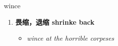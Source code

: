 
\begin{frame}
{\huge wince}
\begin{center}
\begin{enumerate}\Large
  \item \textbf{畏缩，退缩 shrinke back}
  \begin{itemize}
    \item \em{\Large{wince at the horrible corpeses}}
  \end{itemize}
\end{enumerate}
\end{center}
\end{frame}
